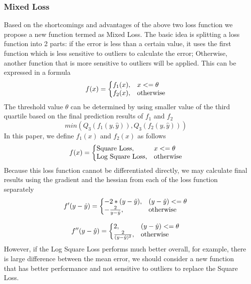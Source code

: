 \documentclass[runningheads]{llncs}
\begin{document}
\subsubsection{Mixed Loss} Based on the shortcomings and advantages of the above two loss function we propose a new function termed as Mixed Loss. The basic idea is splitting a loss function into 2 parts: if the error is less than a certain value, it uses the first function which is less sensitive to outliers to calculate the error; Otherwise, another function that is more sensitive to outliers will be applied. This can be expressed in a formula
\begin{equation}
  f(x)=\left\{
  \begin{array}{@{}ll@{}}
    f_1(x), & x<=\theta \\
    f_2(x), & \text{otherwise}
  \end{array}\right.
\end{equation}
The threshold value $\theta$ can be determined by using smaller value of the third quartile based on the final prediction results of $f_1$ and $f_2$
\begin{equation}
    min(Q_3(f_1(y, \hat{y})), Q_3(f_2(y, \hat{y})))
\end{equation}
In this paper, we define $f_1(x)$ and $f_2(x)$ as follows
\begin{equation}
  f(x)=\left\{
  \begin{array}{@{}ll@{}}
    \text{Square Loss}, & x<=\theta \\
    \text{Log Square Loss}, & \text{otherwise}
  \end{array}\right.
\end{equation}
Because this loss function cannot be differentiated directly, we may calculate final results using the gradient and the hessian from each of the loss function separately
\begin{equation}
  f'(y - \hat{y})=\left\{
  \begin{array}{@{}ll@{}}
    -2*(y - \hat{y}), &  (y - \hat{y})<=\theta \\
    -\frac{2}{y - \hat{y}}, & \text{otherwise}
  \end{array}\right.
\end{equation}

\begin{equation}
  f''(y - \hat{y})=\left\{
  \begin{array}{@{}ll@{}}
    2, & (y - \hat{y})<=\theta \\
    \frac{2}{(y - \hat{y})^2}, & \text{otherwise}
  \end{array}\right.
\end{equation}
However, if the Log Square Loss performs much better overall, for example, there is large difference between the mean error, we should consider a new function that has better performance and not sensitive to outliers to replace the Square Loss.
\end{document}
